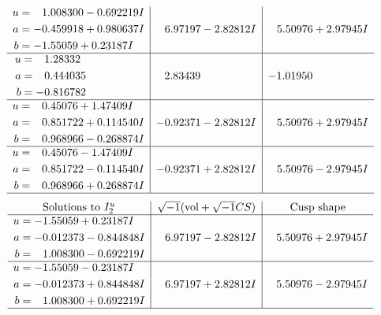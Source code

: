 \documentclass[1p]{elsarticle_modified}
\theoremstyle{definition}
\newcommand{\I}{\sqrt{-1}}
\begin{document}
$$\begin{array}{c|c|c}
\begin{aligned}
u &= \phantom{-}1.008300 - 0.692219 I \\
a &= -0.459918 + 0.980637 I \\
b &= -1.55059 + 0.23187 I\end{aligned}
 & \phantom{-}6.97197 - 2.82812 I & \phantom{-}5.50976 + 2.97945 I \\ \hline\begin{aligned}
u &= \phantom{-}1.28332\phantom{ +0.000000I} \\
a &= \phantom{-}0.444035\phantom{ +0.000000I} \\
b &= -0.816782\phantom{ +0.000000I}\end{aligned}
 & \phantom{-}2.83439\phantom{ +0.000000I} & -1.01950\phantom{ +0.000000I} \\ \hline\begin{aligned}
u &= \phantom{-}0.45076 + 1.47409 I \\
a &= \phantom{-}0.851722 + 0.114540 I \\
b &= \phantom{-}0.968966 - 0.268874 I\end{aligned}
 & -0.92371 - 2.82812 I & \phantom{-}5.50976 + 2.97945 I \\ \hline\begin{aligned}
u &= \phantom{-}0.45076 - 1.47409 I \\
a &= \phantom{-}0.851722 - 0.114540 I \\
b &= \phantom{-}0.968966 + 0.268874 I\end{aligned}
 & -0.92371 + 2.82812 I & \phantom{-}5.50976 - 2.97945 I\\
 \hline 
 \end{array}$$\newpage$$\begin{array}{c|c|c}  
\text{Solutions to }I^u_{2}& \I (\text{vol} + \sqrt{-1}CS) & \text{Cusp shape}\\
 \hline 
\begin{aligned}
u &= -1.55059 + 0.23187 I \\
a &= -0.012373 - 0.844848 I \\
b &= \phantom{-}1.008300 - 0.692219 I\end{aligned}
 & \phantom{-}6.97197 - 2.82812 I & \phantom{-}5.50976 + 2.97945 I \\ \hline\begin{aligned}
u &= -1.55059 - 0.23187 I \\
a &= -0.012373 + 0.844848 I \\
b &= \phantom{-}1.008300 + 0.692219 I\end{aligned}
 & \phantom{-}6.97197 + 2.82812 I & \phantom{-}5.50976 - 2.97945 I\\
 \hline 
 \end{array}$$\newpage\newpage\renewcommand{\arraystretch}{1}
\end{document}

